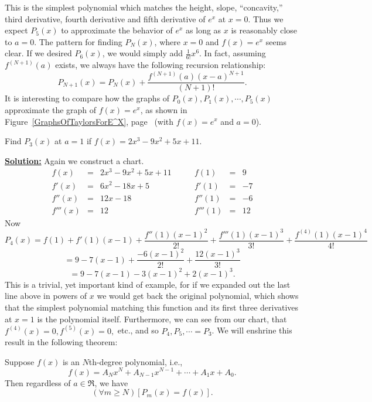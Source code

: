 This is the simplest polynomial which matches the height, slope,
``concavity,'' third derivative, fourth derivative and fifth
derivative of $e^x$ at $x=0$.  Thus we expect $P_5(x)$ to 
approximate the behavior of $e^x$ as long as $x$ is reasonably
close to $a=0$.   
The pattern for finding $P_N(x)$, where $x=0$ and $f(x)=e^x$
seems clear.  If we desired $P_6(x)$, we would simply add
$\frac1{6!}x^6$.  In fact, assuming $f^{(N+1)}(a)$ exists,
we always have the following recursion relationship:
\begin{equation}P_{N+1}(x)=P_N(x)+\frac{f^{(N+1)}(a)(x-a)^{N+1}}{(N+1)!}. 
\label{RecursionForTaylorPolys}\end{equation} 
It is interesting to
compare how the graphs of $P_0(x), P_1(x),\cdots, P_5(x)$ 
approximate the graph of $f(x)=e^x$, as shown in 
Figure~\ref{GraphsOfTaylorsForE^X}, 
page~\pageref{GraphsOfTaylorsForE^X}
(with  $f(x)=e^x$ and $a=0$).  
\eex






\bex Find $P_3(x)$ at $a=1$
if $f(x)=2x^3-9x^2+5x+11.$
\medskip

\underline{\bf Solution:} Again we construct a chart.
$$\begin{array}{rclrcl}
f(x)&=&2x^3-9x^2+5x+11\qquad&f(1)&=&9\\
f'(x)&=&6x^2-18x+5&f'(1)&=&-7\\
f''(x)&=&12x-18&f''(1)&=&-6\\
f'''(x)&=&12&f'''(1)&=&12 \end{array}$$ 
Now
$$P_4(x)=f(1)+f'(1)(x-1)+\frac{f''(1)(x-1)^2}{2!}
+\frac{f'''(1)(x-1)^3}{3!}+\frac{f^{(4)}(1)(x-1)^4}{4!}$$
$$=9-7(x-1)+\frac{-6(x-1)^2}{2!}+\frac{12(x-1)^3}{3!}$$ 
$$=9-7(x-1)-3(x-1)^2+2(x-1)^3.$$ 
\eex
This is a trivial, yet important kind of example,
for if we expanded out the last line above in powers of $x$
we would get back the original
polynomial, which shows that the simplest polynomial
matching this function and its first three derivatives at
$x=1$ is the polynomial itself.  Furthermore, we can see
from our chart, that $f^{(4)}(x)=0, f^{(5)}(x)=0,$ etc.,
and so $P_4, P_5, \cdots=P_3$.   We will enshrine this result 
in the following theorem:
\begin{theorem}
Suppose $f(x)$ is an $N$th-degree polynomial, i.e.,
\begin{equation}f(x)=A_Nx^N+A_{N-1}x^{N-1}+\cdots+A_1x+A_0.\end{equation}
Then regardless of $a\in\Re$, we have
\begin{equation}
(\forall m\ge N)\left[P_m(x)=f(x)\right].\label{PolyForATaylorTheorem}
\end{equation}
\end{theorem}

